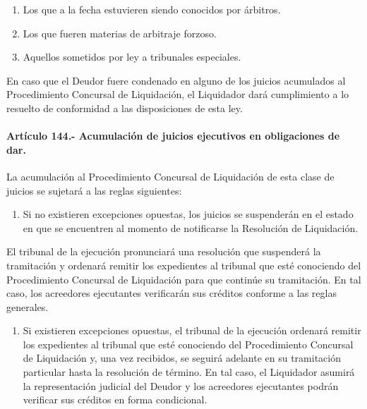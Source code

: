 \documentclass[
]{book}
\providecommand{\tightlist}{%
  \setlength{\itemsep}{0pt}\setlength{\parskip}{0pt}}
\begin{document}
\begin{enumerate}
\def\labelenumi{\arabic{enumi})}
\item
  Los que a la fecha estuvieren siendo conocidos por árbitros.
\item
  Los que fueren materias de arbitraje forzoso.
\item
  Aquellos sometidos por ley a tribunales especiales.
\end{enumerate}

En caso que el Deudor fuere condenado en alguno de los juicios acumulados al Procedimiento Concursal de Liquidación, el Liquidador dará cumplimiento a lo resuelto de conformidad a las disposiciones de esta ley.

\hypertarget{artuxedculo-144.--acumulaciuxf3n-de-juicios-ejecutivos-en-obligaciones-de-dar.}{%
\paragraph*{Artículo 144.- Acumulación de juicios ejecutivos en obligaciones de dar.}\label{artuxedculo-144.--acumulaciuxf3n-de-juicios-ejecutivos-en-obligaciones-de-dar.}}

La acumulación al Procedimiento Concursal de Liquidación de esta clase de juicios se sujetará a las reglas siguientes:

\begin{enumerate}
\def\labelenumi{\arabic{enumi})}
\tightlist
\item
  Si no existieren excepciones opuestas, los juicios se suspenderán en el estado en que se encuentren al momento de notificarse la Resolución de Liquidación.
\end{enumerate}

El tribunal de la ejecución pronunciará una resolución que suspenderá la tramitación y ordenará remitir los expedientes al tribunal que esté conociendo del Procedimiento Concursal de Liquidación para que continúe su tramitación. En tal caso, los acreedores ejecutantes verificarán sus créditos conforme a las reglas generales.

\begin{enumerate}
\def\labelenumi{\arabic{enumi})}
\setcounter{enumi}{1}
\tightlist
\item
  Si existieren excepciones opuestas, el tribunal de la ejecución ordenará remitir los expedientes al tribunal que esté conociendo del Procedimiento Concursal de Liquidación y, una vez recibidos, se seguirá adelante en su tramitación particular hasta la resolución de término. En tal caso, el Liquidador asumirá la representación judicial del Deudor y los acreedores ejecutantes podrán verificar sus créditos en forma condicional.
\end{enumerate}
\end{document}
